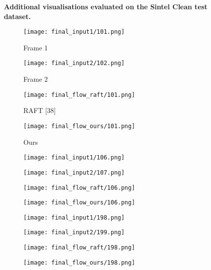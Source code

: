 \documentclass[10pt,twocolumn,letterpaper]{article}
\begin{document}
\begin{figure*}[ht!]
     \caption{\textbf{Additional visualisations evaluated on the Sintel Clean test dataset.} }
    \label{Fig:vis_clean}
\end{figure*} \begin{figure*}[ht!]
     \centering
     \begin{subfigure}[b]{0.245\textwidth}
         \centering
         \caption*{Frame 1}
         \texttt{[image: final\_input1/101.png]}
     \end{subfigure}\hfill
     \begin{subfigure}[b]{0.245\textwidth}
         \centering
         \caption*{Frame 2}
         \texttt{[image: final\_input2/102.png]}
     \end{subfigure}\hfill
     \begin{subfigure}[b]{0.245\textwidth}
         \centering
         \caption*{RAFT [38]}
         \texttt{[image: final\_flow\_raft/101.png]}
     \end{subfigure}\hfill
     \begin{subfigure}[b]{0.245\textwidth}
         \centering
         \caption*{Ours}
         \texttt{[image: final\_flow\_ours/101.png]}
     \end{subfigure}

     \begin{subfigure}[b]{0.245\textwidth}
         \centering
         \texttt{[image: final\_input1/106.png]}
     \end{subfigure}\hfill
     \begin{subfigure}[b]{0.245\textwidth}
         \centering
         \texttt{[image: final\_input2/107.png]}
     \end{subfigure}\hfill
     \begin{subfigure}[b]{0.245\textwidth}
         \centering
         \texttt{[image: final\_flow\_raft/106.png]}
     \end{subfigure}\hfill
     \begin{subfigure}[b]{0.245\textwidth}
         \centering
         \texttt{[image: final\_flow\_ours/106.png]}
     \end{subfigure}

     \begin{subfigure}[b]{0.245\textwidth}
         \centering
         \texttt{[image: final\_input1/198.png]}
     \end{subfigure}\hfill
     \begin{subfigure}[b]{0.245\textwidth}
         \centering
         \texttt{[image: final\_input2/199.png]}
     \end{subfigure}\hfill
     \begin{subfigure}[b]{0.245\textwidth}
         \centering
         \texttt{[image: final\_flow\_raft/198.png]}
     \end{subfigure}\hfill
     \begin{subfigure}[b]{0.245\textwidth}
         \centering
         \texttt{[image: final\_flow\_ours/198.png]}
     \end{subfigure}


\end{figure*}
\end{document}
